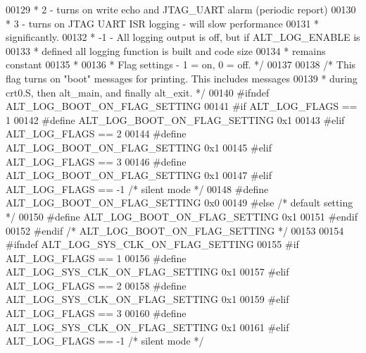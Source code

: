 \begin{DoxyCode}
{{{{00129 \textcolor{comment}{     *            2 - turns on write echo and JTAG\_UART alarm (periodic report)}
00130 \textcolor{comment}{     *            3 - turns on JTAG UART ISR logging - will slow performance}
00131 \textcolor{comment}{     *                significantly. }
00132 \textcolor{comment}{     *           -1 - All logging output is off, but if ALT\_LOG\_ENABLE is }
00133 \textcolor{comment}{     *                defined all logging function is built and code size }
00134 \textcolor{comment}{     *                remains constant }
00135 \textcolor{comment}{     *}
00136 \textcolor{comment}{     * Flag settings - 1 = on, 0 = off. */}
00137 
00138     \textcolor{comment}{/* This flag turns on "boot" messages for printing.  This includes messages}
00139 \textcolor{comment}{     * during crt0.S, then alt\_main, and finally alt\_exit. */}
00140 \textcolor{preprocessor}{    #ifndef ALT\_LOG\_BOOT\_ON\_FLAG\_SETTING}
00141 \textcolor{preprocessor}{        #if ALT\_LOG\_FLAGS == 1}
00142 \textcolor{preprocessor}{            #define ALT\_LOG\_BOOT\_ON\_FLAG\_SETTING 0x1}
00143 \textcolor{preprocessor}{        #elif ALT\_LOG\_FLAGS == 2}
00144 \textcolor{preprocessor}{            #define ALT\_LOG\_BOOT\_ON\_FLAG\_SETTING 0x1}
00145 \textcolor{preprocessor}{        #elif ALT\_LOG\_FLAGS == 3}
00146 \textcolor{preprocessor}{            #define ALT\_LOG\_BOOT\_ON\_FLAG\_SETTING 0x1}
00147 \textcolor{preprocessor}{        #elif ALT\_LOG\_FLAGS == -1 }\textcolor{comment}{/* silent mode */}\textcolor{preprocessor}{}
00148 \textcolor{preprocessor}{            #define ALT\_LOG\_BOOT\_ON\_FLAG\_SETTING 0x0}
00149 \textcolor{preprocessor}{        #else }\textcolor{comment}{/* default setting */}\textcolor{preprocessor}{}
00150 \textcolor{preprocessor}{            #define ALT\_LOG\_BOOT\_ON\_FLAG\_SETTING 0x1}
00151 \textcolor{preprocessor}{        #endif}
00152 \textcolor{preprocessor}{    #endif }\textcolor{comment}{/* ALT\_LOG\_BOOT\_ON\_FLAG\_SETTING */}\textcolor{preprocessor}{}
00153 
00154 \textcolor{preprocessor}{    #ifndef ALT\_LOG\_SYS\_CLK\_ON\_FLAG\_SETTING}
00155 \textcolor{preprocessor}{        #if ALT\_LOG\_FLAGS == 1}
00156 \textcolor{preprocessor}{            #define ALT\_LOG\_SYS\_CLK\_ON\_FLAG\_SETTING 0x1}
00157 \textcolor{preprocessor}{        #elif ALT\_LOG\_FLAGS == 2}
00158 \textcolor{preprocessor}{            #define ALT\_LOG\_SYS\_CLK\_ON\_FLAG\_SETTING 0x1}
00159 \textcolor{preprocessor}{        #elif ALT\_LOG\_FLAGS == 3}
00160 \textcolor{preprocessor}{            #define ALT\_LOG\_SYS\_CLK\_ON\_FLAG\_SETTING 0x1}
00161 \textcolor{preprocessor}{        #elif ALT\_LOG\_FLAGS == -1 }\textcolor{comment}{/* silent mode */}\textcolor{preprocessor}{ }
}}}}
\end{DoxyCode}
